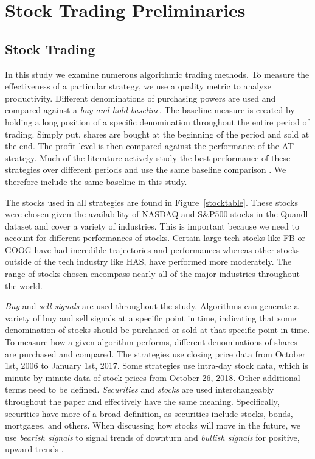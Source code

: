 \documentclass[../thesis.tex]{subfiles}
\begin{document}
\chapter{Stock Trading Preliminaries}
\label{ch:prelim}


\section{Stock Trading}
In this study we examine numerous algorithmic trading methods. To measure the effectiveness of a particular strategy, we use a quality metric to analyze productivity. Different denominations of purchasing powers are used and compared against a \textit {buy-and-hold baseline}. The baseline measure is created by holding a long position of a specific denomination throughout the entire period of trading. Simply put, shares are bought at the beginning of the period and sold at the end. The profit level is then compared against the performance of the AT strategy. Much of the literature actively study the best performance of these strategies over different periods and use the same baseline comparison \cite{Liu2006} \cite{Aldridge2010} \cite{Garcia2015}. We therefore include the same baseline in this study.

The stocks used in all strategies are found in Figure~\ref{stocktable}. These stocks were chosen given the availability of NASDAQ and S\&P500 stocks in the Quandl dataset and cover a variety of industries. This is important because we need to account for different performances of stocks. Certain large tech stocks like FB or GOOG have had incredible trajectories and performances whereas other stocks outside of the tech industry like HAS, have performed more moderately. The range of stocks chosen encompass nearly all of the major industries throughout the world.

\textit {Buy} and \textit {sell signals} are used throughout the study. Algorithms can generate a variety of buy and sell signals at a specific point in time, indicating that some denomination of stocks should be purchased or sold at that specific point in time. To measure how a given algorithm performs, different denominations of shares are purchased and compared. The strategies use closing price data from October 1st, 2006 to January 1st, 2017. Some strategies use intra-day stock data, which is minute-by-minute data of stock prices from October 26, 2018. Other additional terms need to be defined. \textit {Securities} and \textit{stocks} are used interchangeably throughout the paper and effectively have the same meaning. Specifically, securities have more of a broad definition, as securities include stocks, bonds, mortgages, and others. When discussing how stocks will move in the future, we use \textit {bearish signals} to signal trends of downturn and \textit {bullish signals} for positive, upward trends \cite{Aldridge2010}. 
\end{document}
